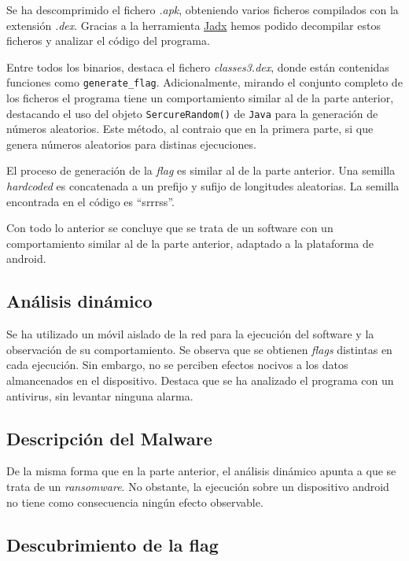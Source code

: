 \documentclass[]{article}
\begin{document}
Se ha descomprimido el fichero \textit{.apk}, obteniendo varios ficheros
compilados con la extensión \textit{.dex}. Gracias a la herramienta
\href{https://github.com/skylot/jadx}{Jadx} hemos podido decompilar estos
ficheros y analizar el código del programa.

Entre todos los binarios, destaca el fichero \textit{classes3.dex}, donde están
contenidas funciones como \texttt{generate\_flag}. Adicionalmente, mirando el
conjunto completo de los ficheros el programa tiene un comportamiento similar
al de la parte anterior, destacando el uso del objeto \texttt{SercureRandom()}
de \texttt{Java} para la generación de números aleatorios. Este método, al
contraio que en la primera parte, si que genera números aleatorios para
distinas ejecuciones.

El proceso de generación de la \textit{flag} es similar al de la parte
anterior. Una semilla \textit{hardcoded} es concatenada a un prefijo y sufijo
de longitudes aleatorias. La semilla encontrada en el código es ``srrrss''. 

Con todo lo anterior se concluye que se trata de un software con un
comportamiento similar al de la parte anterior, adaptado a la plataforma de
android.

\subsection{Análisis dinámico}
\label{subsec:analisis-dinámico-2}

Se ha utilizado un móvil aislado de la red para la ejecución del software y la
observación de su comportamiento. Se observa que se obtienen \textit{flags}
distintas en cada ejecución. Sin embargo, no se perciben efectos nocivos a los
datos almancenados en el dispositivo. Destaca que se ha analizado el programa
con un antivirus, sin levantar ninguna alarma.

\subsection{Descripción del Malware}
\label{malware1}

De la misma forma que en la parte anterior, el análisis dinámico apunta a que
se trata de un \textit{ransomware}. No obstante, la ejecución sobre un
dispositivo android no tiene como consecuencia ningún efecto observable.

\subsection{Descubrimiento de la flag}
\label{flag1}
\end{document}
